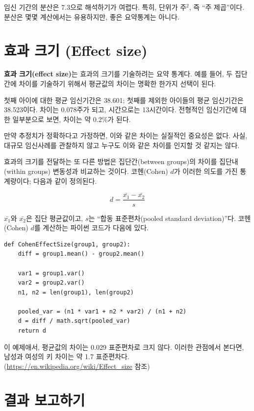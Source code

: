 임신 기간의 분산은 7.3으로 해석하기가 여렵다. 특히, 단위가 주$^2$, 즉 ``주 제곱''이다.
분산은 몇몇 계산에서는 유용하지만, 좋은 요약통계는 아니다.


\section{효과 크기 (Effect size)}

{\bf 효과 크기(effect size)}는 효과의 크기를 기술하려는 요약 통계다. 예를 들어,
두 집단간에 차이를 기술하기 위해서 평균값의 차이는 명확한 한가지 선택이 된다.

첫째 아이에 대한 평균 임신기간은 38.601; 첫째를 제외한 아이들의 평균 임신기간은 38.523이다. 
차이는 0.078주가 되고, 시간으로는 13시간이다. 전형적인 임신기간에 대한 일부분으로 보면, 차이는 약 0.2\%가 된다.

만약 추정치가 정확하다고 가정하면, 이와 같은 차이는 실질적인 중요성은 없다.
사실, 대규모 임신사례를 관찰하지 않고 누구도 이와 같은 차이를 인지할 것 같지는 않다.

효과의 크기를 전달하는 또 다른 방법은 집단간(between groups)의 차이를 집단내(within groups) 변동성과 비교하는 것이다. 코헨(Cohen) $d$가 이러한 의도를 가진 통계량이다; 다음과 같이 정의된다.

%
\[ d = \frac{\bar{x_1} - \bar{x_2}}{s}  \]
%

$\bar{x_1}$와 $\bar{x_2}$은 집단 평균값이고, $s$는 ``합동 표준편차(pooled standard deviation)''다.
코헨(Cohen) $d$를 계산하는 파이썬 코드가 다음에 있다.


\begin{verbatim}
def CohenEffectSize(group1, group2):
    diff = group1.mean() - group2.mean()

    var1 = group1.var()
    var2 = group2.var()
    n1, n2 = len(group1), len(group2)

    pooled_var = (n1 * var1 + n2 * var2) / (n1 + n2)
    d = diff / math.sqrt(pooled_var)
    return d
\end{verbatim}

이 예제애서, 평균값의 차이는 0.029 표준편차로 크지 않다. 이러한 관점에서 본다면,
남성과 여성의 키 차이는 약 1.7 표준편차다.(\url{https://en.wikipedia.org/wiki/Effect_size} 참조)


\section{결과 보고하기}

